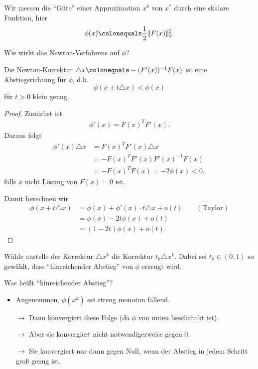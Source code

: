 \begin{idea} Wir messen die "`Güte"' einer Approximation $x^k$ von $x^*$ durch eine skalare Funktion, hier
 \begin{equation*}
  \phi(x)\colonequals\frac{1}{2} \Vert F(x) \Vert_2^2.
 \end{equation*}
\end{idea}

Wie wirkt das Newton-Verfahrens auf $\phi$?

\begin{lemma}
\label{lem:newton_korrektur_ist_abstiegsrichtung}
Die Newton-Korrektur $\triangle x \colonequals -(F'(x) )^{-1}F(x)$ ist eine Abstiegsrichtung für $\phi$, d.h.
\begin{equation*}
 \phi (x + t \triangle x ) < \phi (x)
\end{equation*}
für $t>0$ klein genug.
\end{lemma}
%
\begin{proof}
Zunächst ist
\begin{align*}
 \phi'(x) = F(x)^T F'(x).
\end{align*}
Daraus folgt
\begin{align*}
 \phi'(x) \triangle x & = F(x)^TF'(x) \triangle x \\
   & =-F(x)^T F'(x)F'(x)^{-1} F(x) \\
	& = -F(x)^TF(x)=-2 \phi(x)<0,
\end{align*}
falls $x$ nicht Lösung von $F(x)=0$ ist.

Damit berechnen wir
\begin{align*}
	\phi (x+t \triangle x) & = \phi(x)+\phi'(x) \cdot t \triangle x+o(t) \qquad \mathrm{(Taylor)} \\
	& = \phi(x)-2t \phi(x)+o(t) \\
	& = (1-2t) \phi(x)+o(t).
\end{align*}
\end{proof}

\begin{idea}
Wähle anstelle der Korrektur $\triangle x^k$ die Korrektur $t_k \triangle x^k$.
Dabei sei $t_k \in (0,1)$ so gewählt, dass "`hinreichender Abstieg"' von $\phi$ erzeugt wird.
\end{idea}


Was heißt "`hinreichender Abstieg"'?
\begin{itemize}
 \item Angenommen, $\phi (x^k )$ sei streng monoton fallend.
 \item[$\rightarrow$] Dann konvergiert diese Folge (da $\phi$ von unten beschränkt ist).
 \item[$\rightarrow$] Aber sie konvergiert nicht notwendigerweise gegen $0$.
 \item[$\rightarrow$] Sie konvergiert nur dann gegen Null, wenn der Abstieg in jedem Schritt groß genug ist.
\end{itemize}

